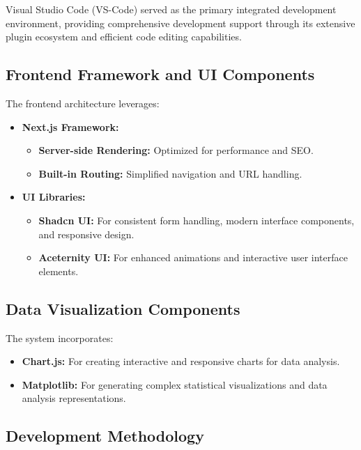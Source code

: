 \documentclass[conference]{IEEEtran}
\begin{document}
Visual Studio Code (VS-Code) served as the primary integrated development environment, providing comprehensive development support through its extensive plugin ecosystem and efficient code editing capabilities.

\subsection{Frontend Framework and UI Components}

The frontend architecture leverages:
\begin{itemize}
    \item \textbf{Next.js Framework:} 
    \begin{itemize}
        \item \textbf{Server-side Rendering:} Optimized for performance and SEO.
        \item \textbf{Built-in Routing:} Simplified navigation and URL handling.
        
    \end{itemize}
    
    \item \textbf{UI Libraries:}
        \begin{itemize}
            \item \textbf{Shadcn UI:} For consistent form handling, modern interface components, and responsive design.
            \item \textbf{Aceternity UI:} For enhanced animations and interactive user interface elements.
        \end{itemize}
\end{itemize}

\subsection{Data Visualization Components}

The system incorporates:
\begin{itemize}
    \item \textbf{Chart.js:} For creating interactive and responsive charts for data analysis.
    \item \textbf{Matplotlib:} For generating complex statistical visualizations and data analysis representations.
\end{itemize}

\subsection{Development Methodology}
\end{document}
